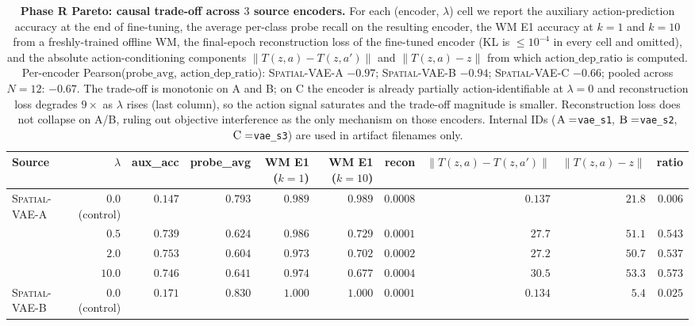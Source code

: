 \begin{table}[h]
\centering
\caption{\textbf{Phase R Pareto: causal trade-off across $3$ source encoders.} For each (encoder, $\lambda$) cell we report the auxiliary action-prediction accuracy at the end of fine-tuning, the average per-class probe recall on the resulting encoder, the WM E1 accuracy at $k{=}1$ and $k{=}10$ from a freshly-trained offline WM, the final-epoch reconstruction loss of the fine-tuned encoder (KL is $\le 10^{-4}$ in every cell and omitted), and the absolute action-conditioning components $\|T(z,a){-}T(z,a')\|$ and $\|T(z,a){-}z\|$ from which $\mathrm{action\_dep\_ratio}$ is computed. Per-encoder Pearson($\mathrm{probe\_avg}$, $\mathrm{action\_dep\_ratio}$): \textsc{Spatial-VAE-A} $-0.97$; \textsc{Spatial-VAE-B} $-0.94$; \textsc{Spatial-VAE-C} $-0.66$; pooled across $N{=}12$: $-0.67$. The trade-off is monotonic on \textsc{A} and \textsc{B}; on \textsc{C} the encoder is already partially action-identifiable at $\lambda{=}0$ and reconstruction loss degrades $9\times$ as $\lambda$ rises (last column), so the action signal saturates and the trade-off magnitude is smaller. Reconstruction loss does not collapse on \textsc{A}/\textsc{B}, ruling out objective interference as the only mechanism on those encoders. Internal IDs ($\textsc{A}=$\texttt{vae\_s1}, $\textsc{B}=$\texttt{vae\_s2}, $\textsc{C}=$\texttt{vae\_s3}) are used in artifact filenames only.}
\label{tab:phase-R-pareto}
\small
\setlength{\tabcolsep}{4pt}
\begin{tabular}{l r r r r r r r r r}
\hline
Source & $\lambda$ & aux\_acc & probe\_avg & WM E1 ($k{=}1$) & WM E1 ($k{=}10$) & recon & $\|T(z,a){-}T(z,a')\|$ & $\|T(z,a){-}z\|$ & ratio \\
\hline
\textsc{Spatial-VAE-A} & $0.0$ (control) & $0.147$ & $\mathbf{0.793}$ & $0.989$ & $0.989$ & $0.0008$ & $0.137$  & $21.8$ & $\mathbf{0.006}$ \\
                       & $0.5$           & $0.739$ & $0.624$ & $0.986$ & $0.729$ & $0.0001$ & $27.7$   & $51.1$ & $0.543$ \\
                       & $2.0$           & $0.753$ & $0.604$ & $0.973$ & $0.702$ & $0.0002$ & $27.2$   & $50.7$ & $0.537$ \\
                       & $10.0$          & $0.746$ & $0.641$ & $0.974$ & $0.677$ & $0.0004$ & $30.5$   & $53.3$ & $0.573$ \\
\hline
\textsc{Spatial-VAE-B} & $0.0$ (control) & $0.171$ & $\mathbf{0.830}$ & $1.000$ & $1.000$ & $0.0001$ & $0.134$  & $5.4$  & $\mathbf{0.025}$ \\

\end{tabular}
\end{table}
